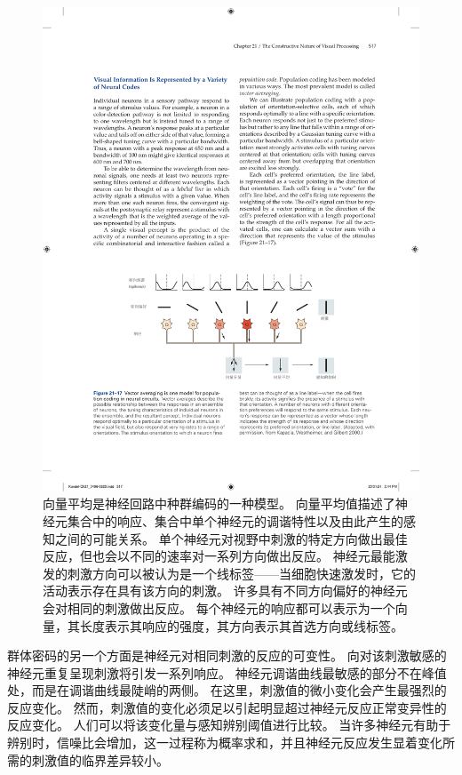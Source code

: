 \begin{figure}[htbp]
	\centering
	\includegraphics[width=1.0\linewidth]{chap21/fig_21_17}
	\caption{向量平均是神经回路中种群编码的一种模型。
		向量平均值描述了神经元集合中的响应、集合中单个神经元的调谐特性以及由此产生的感知之间的可能关系。 
		单个神经元对视野中刺激的特定方向做出最佳反应，但也会以不同的速率对一系列方向做出反应。
		神经元最能激发的刺激方向可以被认为是一个线标签——当细胞快速激发时，它的活动表示存在具有该方向的刺激。
		许多具有不同方向偏好的神经元会对相同的刺激做出反应。
		每个神经元的响应都可以表示为一个向量，其长度表示其响应的强度，其方向表示其首选方向或线标签\cite{kapadia2000spatial}。}
	\label{fig:21_17}
\end{figure}


群体密码的另一个方面是神经元对相同刺激的反应的可变性。
向对该刺激敏感的神经元重复呈现刺激将引发一系列响应。
神经元调谐曲线最敏感的部分不在峰值处，而是在调谐曲线最陡峭的两侧。
在这里，刺激值的微小变化会产生最强烈的反应变化。
然而，刺激值的变化必须足以引起明显超过神经元反应正常变异性的反应变化。
人们可以将该变化量与感知辨别阈值进行比较。
当许多神经元有助于辨别时，信噪比会增加，这一过程称为概率求和，并且神经元反应发生显着变化所需的刺激值的临界差异较小。


